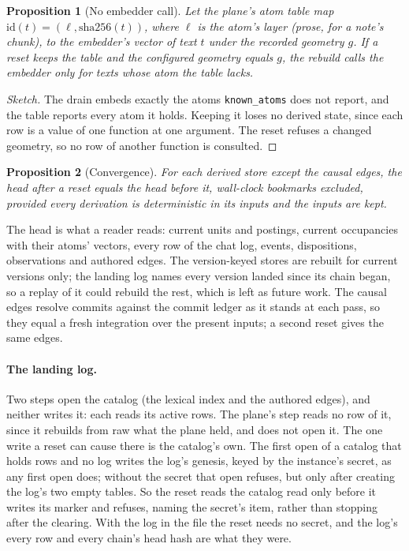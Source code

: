 \documentclass[11pt]{article}
\theoremstyle{plain}
\newtheorem{proposition}{Proposition}
\theoremstyle{definition}
\theoremstyle{remark}
\newcommand{\code}[1]{\texttt{#1}}
\begin{document}
\begin{proposition}[No embedder call]\label{prop:noembed}
Let the plane's atom table map $\mathrm{id}(t) = (\ell, \mathrm{sha256}(t))$, where $\ell$ is the
atom's layer (prose, for a note's chunk), to the embedder's vector of text $t$ under the recorded
geometry $g$. If a reset keeps the table and the configured
geometry equals $g$, the rebuild calls the embedder only for texts whose atom the table lacks.
\end{proposition}
\begin{proof}[Sketch]
The drain embeds exactly the atoms \code{known\_atoms} does not report, and the table reports every
atom it holds. Keeping it loses no derived state, since each row is a value of one function at one
argument. The reset refuses a changed geometry, so no row of another function is consulted.
\end{proof}

\begin{proposition}[Convergence]\label{prop:conv}
For each derived store except the causal edges, the head after a reset equals the head before it,
wall-clock bookmarks excluded, provided every derivation is deterministic in its inputs and the
inputs are kept.
\end{proposition}
The head is what a reader reads: current units and postings, current occupancies with their atoms'
vectors, every row of the chat log, events, dispositions, observations and authored edges. The
version-keyed stores are rebuilt for current versions only; the landing log names every version
landed since its chain began, so a replay of it could rebuild the rest, which is left as future
work. The causal edges resolve commits against the
commit ledger as it stands at each pass, so they equal a fresh integration over the present inputs;
a second reset gives the same edges.

\paragraph{The landing log.} Two steps open the catalog (the lexical index and the authored
edges), and neither writes it: each reads its active rows. The plane's step reads no row of it,
since it rebuilds from raw what the plane held, and does not open it. The one write a reset can
cause there is the catalog's own. The first open of a catalog that holds rows and no log writes the
log's genesis, keyed by the instance's secret, as any first open does; without the secret that
open refuses, but only after creating the log's two empty tables. So the reset reads the catalog
read only before it writes its marker and refuses, naming the secret's item, rather than stopping
after the clearing. With the log in the file the reset needs no secret, and the log's every row
and every chain's head hash are what they were.
\end{document}
